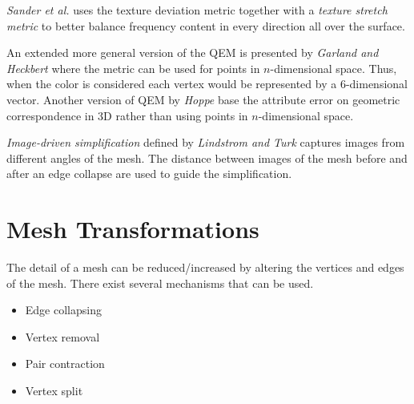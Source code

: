 \emph{Sander et al.} \cite{sander2001texture} uses the texture deviation metric together with a \emph{texture stretch metric} to better balance frequency content in every direction all over the surface.

An extended more general version of the QEM is presented by \emph{Garland and Heckbert} \cite{garland1998simplifying} where the metric can be used for points in $n$-dimensional space. Thus, when the color is considered each vertex would be represented by a 6-dimensional vector. Another version of QEM by \emph{Hoppe} \cite{Hoppe:1999:NQM:319351.319357} base the attribute error on geometric correspondence in 3D rather than using points in $n$-dimensional space.

\emph{Image-driven simplification} defined by \emph{Lindstrom and Turk} \cite{lindstrom2000image} captures images from different angles of the mesh. The distance between images of the mesh before and after an edge collapse are used to guide the simplification.

%
  
\iffalse %
\section{Mesh Transformations} \label{sec:mesh_transformations}
The detail of a mesh can be reduced/increased by altering the vertices and edges of the mesh. There exist several mechanisms that can be used.

\begin{itemize}
\item Edge collapsing
\item Vertex removal
\item Pair contraction
\item Vertex split
\end{itemize}

